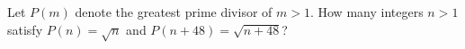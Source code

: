 Let $P(m)$ denote the greatest prime divisor of $m>1$. How many integers $n>1$ satisfy $P(n)=\sqrt n$ and $P(n+48)=\sqrt{n+48}$?
